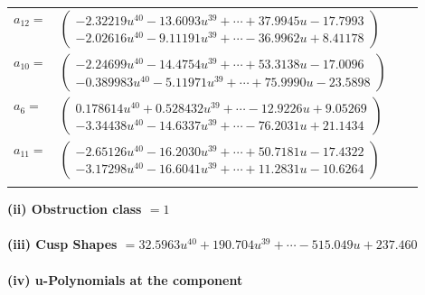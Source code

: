 \documentclass[1p]{elsarticle_modified}
\theoremstyle{definition}
\begin{document}
\begin{tabular}{m{7pt} m{180pt} m{7pt} m{180pt} }
\flushright $a_{12}=$&$\begin{pmatrix}-2.32219 u^{40}-13.6093 u^{39}+\cdots+37.9945 u-17.7993\\-2.02616 u^{40}-9.11191 u^{39}+\cdots-36.9962 u+8.41178\end{pmatrix}$ \\
\flushright $a_{10}=$&$\begin{pmatrix}-2.24699 u^{40}-14.4754 u^{39}+\cdots+53.3138 u-17.0096\\-0.389983 u^{40}-5.11971 u^{39}+\cdots+75.9990 u-23.5898\end{pmatrix}$ \\
\flushright $a_{6}=$&$\begin{pmatrix}0.178614 u^{40}+0.528432 u^{39}+\cdots-12.9226 u+9.05269\\-3.34438 u^{40}-14.6337 u^{39}+\cdots-76.2031 u+21.1434\end{pmatrix}$ \\
\flushright $a_{11}=$&$\begin{pmatrix}-2.65126 u^{40}-16.2030 u^{39}+\cdots+50.7181 u-17.4322\\-3.17298 u^{40}-16.6041 u^{39}+\cdots+11.2831 u-10.6264\end{pmatrix}$\\&\end{tabular}
\flushleft \textbf{(ii) Obstruction class $= 1$}\\~\\
\flushleft \textbf{(iii) Cusp Shapes $= 32.5963 u^{40}+190.704 u^{39}+\cdots-515.049 u+237.460$}\\~\\
\newpage\renewcommand{\arraystretch}{1}
\flushleft \textbf{(iv) u-Polynomials at the component}\newline \\
\end{document}
